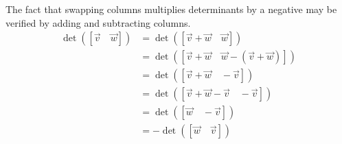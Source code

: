 \begin{observation}
The fact that swapping columns multiplies determinants by a negative
may be verified by adding and subtracting columns.
\begin{align*}
  \det([\vec{v}\hspace{1em}\vec{w}])
&=
  \det([\vec{v}+\vec{w}\hspace{1em}\vec{w}])
\\ &=
  \det([\vec{v}+\vec{w}\hspace{1em}\vec{w}-(\vec{v}+\vec{w})])
\\ &=
  \det([\vec{v}+\vec{w}\hspace{1em}-\vec{v}])
\\ &=
  \det([\vec{v}+\vec{w}-\vec{v}\hspace{1em}-\vec{v}])
\\ &=
  \det([\vec{w}\hspace{1em}-\vec{v}])
\\ &=
  -\det([\vec{w}\hspace{1em}\vec{v}])
  \end{align*}
\end{observation}



